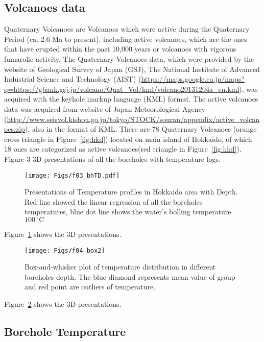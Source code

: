 


\subsection{Volcanoes data}

Quaternary Volcanoes are Volcanoes which were active during the Quaternary Period (ca. 2.6 Ma to present), including active volcanoes, which are the ones that have erupted within the past 10,000 years or volcanoes with vigorous fumarolic activity. The Quaternary Volcanoes data, which were provided by the website of Geological Survey of Japan (GSJ), The National Institute of Advanced Industrial Science and Technology (AIST) (\url{https://maps.google.co.jp/maps?q=https://gbank.gsj.jp/volcano/Quat_Vol/kml/volcano20131204a_en.kml}), was acquired with the keyhole markup language (KML) format. The active volcanoes data was acquired from website of Japan Meteorological Agency (\url{http://www.seisvol.kishou.go.jp/tokyo/STOCK/souran/appendix/active\_volcanoes.zip}), also in the format of KML. There are 78 Quaternary Volcanoes (orange cross triangle in Figure~\ref{fig:hkd}) located on main island of Hokkaido, of which 18 ones are categorized as active volcanoes(red triangle in Figure~\ref{fig:hkd}).
Figure 3 3D presentations of all the boreholes with temperature logs.

\begin{figure} [ht!]
    \texttt{[image: Figs/f03\_bhTD.pdf]}
  \caption{Presentations of Temperature profiles in Hokkaido area with Depth. Red line showed the linear regression of all the boreholes temperatures, blue dot line shows the water's bolling temperature $100\,^{\circ}\mathrm{C}$}
  \label{fig:bh3d}
\end{figure}
Figure~\ref{fig:bh3d} shows the 3D presentations.

\begin{figure} [ht!]
    \texttt{[image: Figs/f04\_box2]}
  \caption{Box-and-whisker plot of temperature distribution in different boreholes depth. The blue diamond represents mean value of group and red point are outliers of temperature.
  }
  \label{fig:box2}
\end{figure}
Figure~\ref{fig:box2} shows the 3D presentations.

\subsection{Borehole Temperature}

